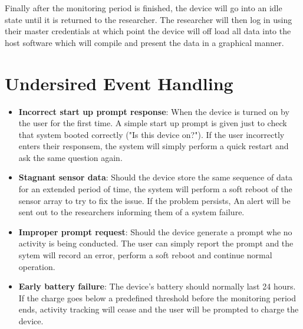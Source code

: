 \documentclass[12pt]{article}
\begin{document}
Finally after the monitoring period is finished, the device will go into an idle state until it is returned to the researcher. The researcher will then log in using their master credentials at which point the device will off load all data into the host software which will compile and present the data in a graphical manner.

\section{Undersired Event Handling}
\label{UEH}
\begin{itemize}
	\item \textbf{Incorrect start up prompt response}: When the device is turned on by the user for the first time. A simple start up prompt is given just to check that system booted correctly ("Is this device on?"). If the user incorrectly enters their responsem, the system will simply 				perform a quick restart and ask the same question again.

	\item \textbf{Stagnant sensor data}: Should the device store the same sequence of data for an extended period of time, the system will perform a soft reboot of the sensor array to try to fix the issue. If the problem persists, An alert will be sent out to the researchers informing them 			of a system failure.

	\item \textbf{Improper prompt request}: Should the device generate a prompt whe no activity is being conducted. The user can simply report the prompt and the sytem will record an error, perform a soft reboot and continue normal operation.

	\item \textbf{Early battery failure}: The device's battery should normally last 24 hours. If the charge goes below a predefined threshold before the monitoring period ends, activity tracking will cease and the user will be prompted to charge the device.
\end{itemize}





\pagebreak
\end{document}
